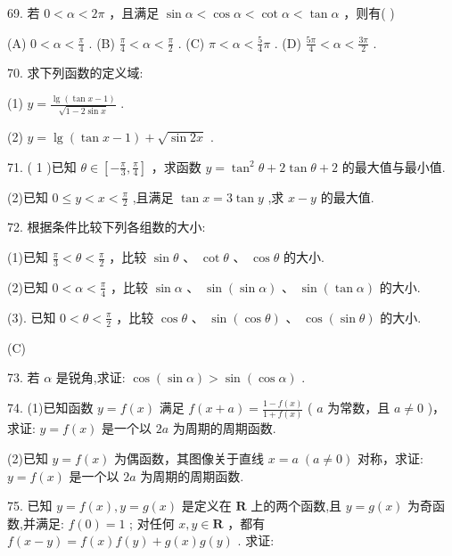 \documentclass[10pt]{article}
\newcommand*\circled[1]{\tikz[baseline=(char.base)]{\node[shape=circle,draw,inner sep=1.5pt] (char) {\small #1};}}
\begin{document}
69. 若 \(0 < \alpha  < {2\pi }\) ，且满足 \(\sin \alpha  < \cos \alpha  < \cot \alpha  < \tan \alpha\) ，则有( )

(A) \(0 < \alpha  < \frac{\pi }{4}\) . (B) \(\frac{\pi }{4} < \alpha  < \frac{\pi }{2}\) . (C) \(\pi  < \alpha  < \frac{5}{4}\pi\) . (D) \(\frac{5\pi }{4} < \alpha  < \frac{3\pi }{2}\) .

70. 求下列函数的定义域:

(1) \(y = \frac{\lg \left( {\tan x - 1}\right) }{\sqrt{1 - 2\sin x}}\) .

(2) \(y = \lg \left( {\tan x - 1}\right)  + \sqrt{\sin {2x}}\) .

71. ( 1 )已知 \(\theta  \in  \left\lbrack  {-\frac{\pi }{3},\frac{\pi }{4}}\right\rbrack\) ，求函数 \(y = {\tan }^{2}\theta  + 2\tan \theta  + 2\) 的最大值与最小值.

(2)已知 \(0 \leq  y < x < \frac{\pi }{2}\) ,且满足 \(\tan x = 3\tan y\) ,求 \(x - y\) 的最大值.

72. 根据条件比较下列各组数的大小:

(1)已知 \(\frac{\pi }{3} < \theta  < \frac{\pi }{2}\) ，比较 \(\sin \theta\) 、 \(\cot \theta\) 、 \(\cos \theta\) 的大小.

(2)已知 \(0 < \alpha  < \frac{\pi }{4}\) ，比较 \(\sin \alpha\) 、 \(\sin \left( {\sin \alpha }\right)\) 、 \(\sin \left( {\tan \alpha }\right)\) 的大小.

(3). 已知 \(0 < \theta  < \frac{\pi }{2}\) ，比较 \(\cos \theta\) 、 \(\sin \left( {\cos \theta }\right)\) 、 \(\cos \left( {\sin \theta }\right)\) 的大小.

(C)

73. 若 \(\alpha\) 是锐角,求证: \(\cos \left( {\sin \alpha }\right)  > \sin \left( {\cos \alpha }\right)\) .

74. (1)已知函数 \(y = f\left( x\right)\) 满足 \(f\left( {x + a}\right)  = \frac{1 - f\left( x\right) }{1 + f\left( x\right) }\) ( \(a\) 为常数，且 \(a \neq  0\) )，求证: \(y = f\left( x\right)\) 是一个以 \({2a}\) 为周期的周期函数.

(2)已知 \(y = f\left( x\right)\) 为偶函数，其图像关于直线 \(x = a\;\left( {a \neq  0}\right)\) 对称，求证: \(y = f\left( x\right)\) 是一个以 \({2a}\) 为周期的周期函数.

75. 已知 \(y = f\left( x\right) ,y = g\left( x\right)\) 是定义在 \(\mathbf{R}\) 上的两个函数,且 \(y = g\left( x\right)\) 为奇函数,并满足:  \circled{1}  \(f\left( 0\right)  = 1\) ;  \circled{2} 对任何 \(x,y \in  \mathbf{R}\) ，都有 \(f\left( {x - y}\right)  = f\left( x\right) f\left( y\right)  + g\left( x\right) g\left( y\right)\) . 求证:
\end{document}
